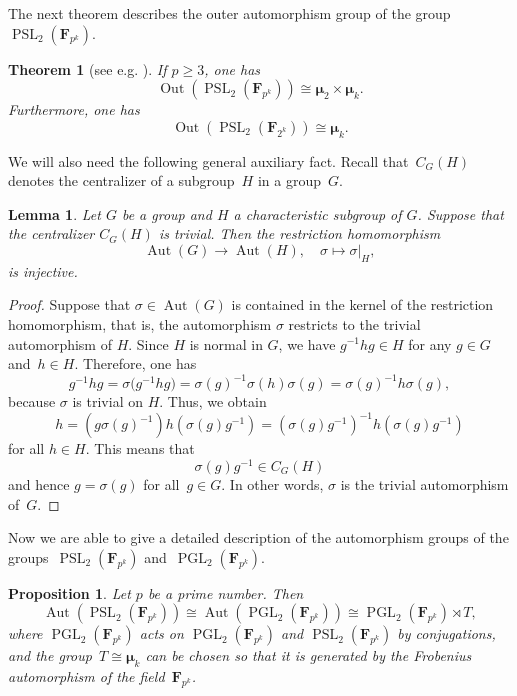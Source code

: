 \documentclass[12pt]{amsart}
\numberwithin{equation}{section}
\newtheorem{lemma}[subsection]{Lemma}
\newtheorem{proposition}[subsection]{Proposition}
\newtheorem{theorem}[subsection]{Theorem}
\theoremstyle{definition}
\newcommand{\mumu}{\boldsymbol{\mu}}
\DeclareMathOperator{\Aut}{Aut}
\DeclareMathOperator{\Out}{Out}
\DeclareMathOperator{\PGL}{PGL}
\DeclareMathOperator{\PSL}{PSL}
\def \ge {\geqslant}
\begin{document}
The next theorem describes the outer automorphism group of the
group~\mbox{$\PSL_2(\mathbf{F}_{p^k})$}.

\begin{theorem}[{see e.g. \cite[Theorem~3.2(ii)]{Wilson}}]
\label{theorem:Out-PSL}
If $p\ge 3$, one has
$$
\Out(\PSL_2(\mathbf{F}_{p^k}))\cong \mumu_2\times \mumu_k.
$$
Furthermore, one has
$$
\Out(\PSL_2(\mathbf{F}_{2^k}))\cong \mumu_k.
$$
\end{theorem}

We will also need the following general auxiliary fact.
Recall that~$C_G(H)$ denotes the centralizer of a subgroup~$H$ in a group~$G$.

\begin{lemma}\label{lemma:restriction-Aut}
Let $G$ be a group and $H$ a characteristic subgroup of $G$.
Suppose that the centralizer $C_G(H)$ is trivial.
Then the restriction homomorphism
$$
\Aut(G)\to\Aut(H), \quad \sigma\mapsto \sigma\vert_H,
$$
is injective.
\end{lemma}

\begin{proof}
Suppose that $\sigma \in\Aut(G)$ is contained in the kernel of the restriction
homomorphism, that is,
the automorphism $\sigma$ restricts to the trivial automorphism of $H$.
Since $H$ is normal in $G$, we have $g^{-1}hg\in H$ for any $g\in G$ and~\mbox{$h\in H$}.
Therefore, one has
$$
g^{-1}hg=\sigma\big(g^{-1}hg\big)=\sigma(g)^{-1}\sigma(h)\sigma(g)=\sigma(g)^{-1}h\sigma(g),
$$
because $\sigma$ is trivial on $H$.
Thus, we obtain
$$
h=(g\sigma(g)^{-1})h(\sigma(g)g^{-1})=
(\sigma(g)g^{-1})^{-1}h(\sigma(g)g^{-1})
$$
for all $h\in H$. This means that
$$
\sigma(g)g^{-1}\in C_G(H)
$$
and hence $g=\sigma(g)$ for all~\mbox{$g\in G$}. In other words, $\sigma$ is the trivial automorphism of~$G$.
\end{proof}

Now we are able to give a detailed description of the automorphism groups of the
groups~\mbox{$\PSL_2(\mathbf{F}_{p^k})$} and~\mbox{$\PGL_2(\mathbf{F}_{p^k})$}.

\begin{proposition}
\label{proposition:Aut-PSL-PGL}
Let $p$ be a prime number. Then
$$
\Aut(\PSL_2(\mathbf{F}_{p^k}))\cong
\Aut(\PGL_2(\mathbf{F}_{p^k}))\cong
\PGL_2(\mathbf{F}_{p^k})\rtimes T,
$$
where $\PGL_2(\mathbf{F}_{p^k})$ acts on $\PGL_2(\mathbf{F}_{p^k})$ and $\PSL_2(\mathbf{F}_{p^k})$ by conjugations, and the
group~\mbox{$T\cong\mumu_k$} can be chosen so that it is generated by the Frobenius
automorphism of the field~$\mathbf{F}_{p^k}$.
\end{proposition}
\end{document}
